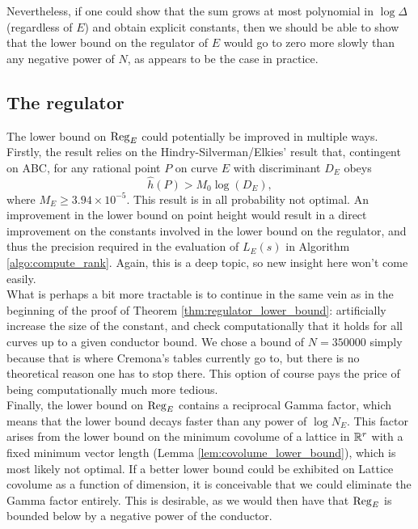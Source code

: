 Nevertheless, if one could show that the sum grows at most polynomial in $\log \Delta$ (regardless of $E$) and obtain explicit constants, then we should be able to show that the lower bound on the regulator of $E$ would go to zero more slowly than any negative power of $N$, as appears to be the case in practice. \\

\subsection{The regulator}

The lower bound on $\operatorname{Reg}_E$ could potentially be improved in multiple ways. Firstly, the result relies on the Hindry-Silverman/Elkies' result \cite{Elk-2006} that, contingent on ABC, for any rational point $P$ on curve $E$ with discriminant $D_E$ obeys
\begin{equation}
\hat{h}(P) > M_0 \log(D_E),
\end{equation}
where $M_E \ge 3.94\times 10^{-5}$. This result is in all probability not optimal. An improvement in the lower bound on point height would result in a direct improvement on the constants involved in the lower bound on the regulator, and thus the precision required in the evaluation of $L_E(s)$ in Algorithm \ref{algo:compute_rank}. Again, this is a deep topic, so new insight here won't come easily. \\

What is perhaps a bit more tractable is to continue in the same vein as in the beginning of the proof of Theorem \ref{thm:regulator_lower_bound}: artificially increase the size of the constant, and check computationally that it holds for all curves up to a given conductor bound. We chose a bound of $N=350000$ simply because that is where Cremona's tables currently go to, but there is no theoretical reason one has to stop there. This option of course pays the price of being computationally much more tedious. \\

Finally, the lower bound on $\operatorname{Reg}_E$ contains a reciprocal Gamma factor, which means that the lower bound decays faster than any power of $\log N_E$. This factor arises from the lower bound on the minimum covolume of a lattice in $\mathbb{R}^r$ with a fixed minimum vector length (Lemma \ref{lem:covolume_lower_bound}), which is most likely not optimal. If a better lower bound could be exhibited on Lattice covolume as a function of dimension, it is conceivable that we could eliminate the Gamma factor entirely. This is desirable, as we would then have that $\operatorname{Reg}_E$ is bounded below by a negative power of the conductor.

